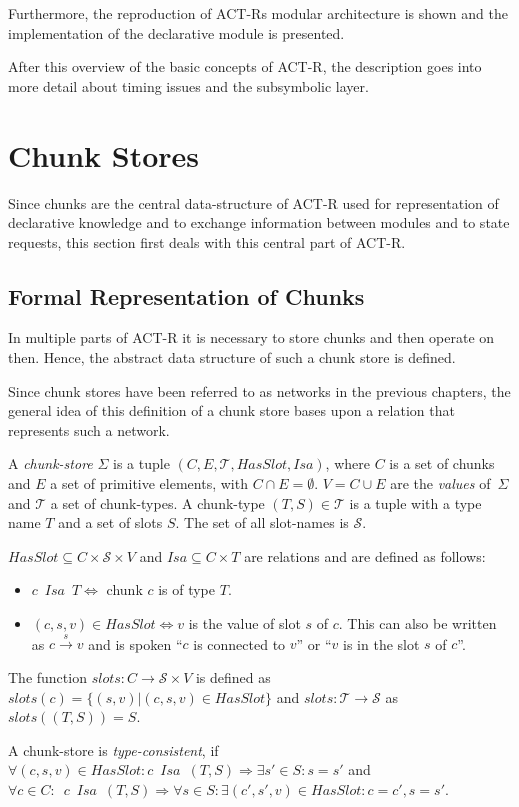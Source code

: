 Furthermore, the reproduction of ACT-Rs modular architecture is shown and the implementation of the declarative module is presented.

After this overview of the basic concepts of ACT-R, the description goes into more detail about timing issues and the subsymbolic layer.

\section{Chunk Stores}

Since chunks are the central data-structure of ACT-R used for representation of declarative knowledge and to exchange information between modules and to state requests, this section first deals with this central part of ACT-R.

\subsection{Formal Representation of Chunks}

In multiple parts of ACT-R it is necessary to store chunks and then operate on then. Hence, the abstract data structure of such a chunk store is defined.

Since chunk stores have been referred to as networks in the previous chapters, the general idea of this definition of a chunk store bases upon a relation that represents such a network.

\begin{definition}
A \emph{chunk-store} $\Sigma$ is a tuple $(C,E,\mathcal{T},HasSlot,Isa)$, where $C$ is a set of chunks and $E$ a set of primitive elements, with $C \cap E = \emptyset$. $V = C \cup E$ are the \emph{values} of~$\Sigma$ and $\mathcal{T}$ a set of chunk-types. A chunk-type $(T,S) \in \mathcal{T}$ is a tuple with a type name $T$ and a set of slots $S$. The set of all slot-names is $\mathcal{S}$. 

$HasSlot \subseteq C \times \mathcal{S} \times V$ and $Isa \subseteq C \times T$ are relations and are defined as follows:

\begin{itemize}
 \item $c \enspace Isa \enspace T \Leftrightarrow$ chunk $c$ is of type $T$.
 \item $(c,s,v) \in HasSlot \Leftrightarrow v$ is the value of slot $s$ of $c$. This can also be written as $c \overset{s}{\longrightarrow} v$ and is spoken ``$c$ is connected to $v$'' or ``$v$ is in the slot $s$ of $c$''.
\end{itemize}


The function $slots: C \rightarrow \mathcal{S} \times V$ is defined as $slots(c) = \{ (s,v) | (c,s,v) \in HasSlot \}$ and $slots: \mathcal{T} \rightarrow \mathcal{S}$ as $slots((T,S)) = S$.

A chunk-store is \emph{type-consistent}, if $\forall(c,s,v) \in HasSlot: c \enspace Isa \enspace (T,S) \Rightarrow \exists s' \in S: s=s'$ and $\forall c \in C: \enspace c \enspace Isa \enspace (T,S) \Rightarrow \forall s \in S: \exists (c',s',v) \in HasSlot: c=c', s=s'$.
\end{definition}


